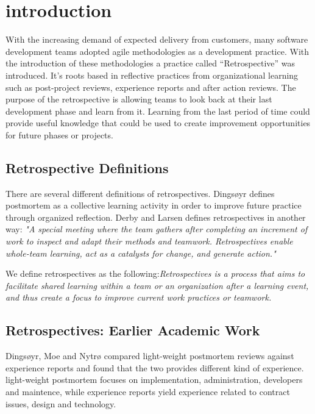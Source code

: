 \section{introduction}
With the increasing demand of expected delivery from customers, many software development teams adopted agile methodologies as a development practice. With the introduction of these methodologies a practice called ``Retrospective'' was introduced. It's roots based in reflective practices from organizational learning such as post-project reviews, experience reports and after action reviews. The purpose of the retrospective is allowing teams to look back at their last development phase and learn from it. Learning from the last period of time could provide useful knowledge that could be used to create improvement opportunities for future phases or projects. 


\subsection{Retrospective Definitions}
There are several different definitions of retrospectives. Dingsøyr \cite{Dingsoyr2004} defines postmortem as a collective learning activity in order to improve future practice through organized reflection. Derby and Larsen \cite{Larsen2006} defines retrospectives in another way: \textit{"A special meeting where the team gathers after completing an increment of work to inspect and adapt their methods and teamwork. Retrospectives enable whole-team learning, act as a catalysts for change, and generate action."}

We define retrospectives as the following:\textit{Retrospectives is a process that aims to facilitate shared learning within a team or an organization after a learning event, and thus create a focus to improve current work practices or teamwork.}


\subsection{Retrospectives: Earlier Academic Work}
Dingsøyr, Moe and Nytrø compared light-weight postmortem reviews against experience reports and found that the two provides different kind of experience. light-weight postmortem focuses on implementation, administration, developers and maintence, while experience reports yield experience related to contract issues, design and technology. 

